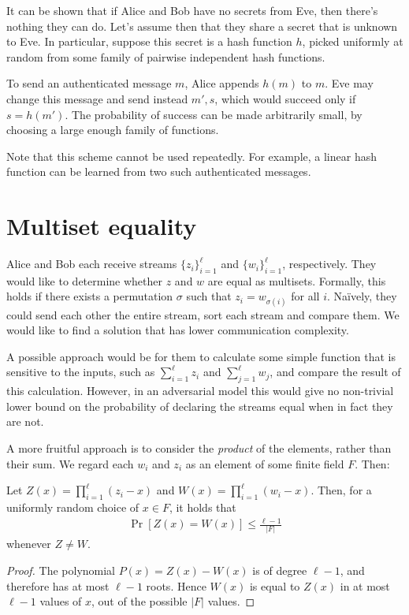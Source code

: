 \documentclass{article}
\begin{document}
It can be shown that if Alice and Bob have no secrets from Eve, then
there's nothing they can do. Let's assume then that they share a
secret that is unknown to Eve. In particular, suppose this secret is a
hash function $h$, picked uniformly at random from some family of
pairwise independent hash functions.

To send an authenticated message $m$, Alice appends $h(m)$ to $m$. Eve
may change this message and send instead $m',s$, which would succeed
only if $s=h(m')$. The probability of success can be made arbitrarily
small, by choosing a large enough family of functions.

Note that this scheme cannot be used repeatedly. For example, a linear
hash function can be learned from two such authenticated messages.

\section{Multiset equality}
Alice and Bob each receive streams $\{z_i\}_{i=1}^\ell$ and
$\{w_i\}_{i=1}^\ell$, respectively. They would like to determine whether
$z$ and $w$ are equal as multisets. Formally, this holds if there
exists a permutation $\sigma$ such that $z_i=w_{\sigma(i)}$ for all
$i$. Na\"ively, they could send each other the entire stream, sort
each stream and compare them. We would like to find a solution that
has lower communication complexity.

A possible approach would be for them to calculate some simple
function that is sensitive to the inputs, such as $\sum_{i=1}^\ell z_i$
and $\sum_{j=1}^\ell w_j$, and compare the result of this
calculation. However, in an adversarial model this would give no
non-trivial lower bound on the probability of declaring the streams
equal when in fact they are not.

A more fruitful approach is to consider the {\em product} of the
elements, rather than their sum. We regard each $w_i$ and $z_i$ as an
element of some finite field $F$. Then:
\begin{claim}
  Let $Z(x)=\prod_{i=1}^\ell(z_i-x)$ and
  $W(x)=\prod_{i=1}^\ell(w_i-x)$. Then, for a uniformly random choice
  of $x \in F$, it holds that
  \begin{align*}
    \Pr[Z(x)=W(x)] \leq \frac{\ell-1}{|F|}
  \end{align*}
  whenever $Z \neq W$.
\end{claim}
\begin{proof}
  The polynomial $P(x)=Z(x)-W(x)$ is of degree $\ell-1$, and therefore
  has at most $\ell-1$ roots. Hence $W(x)$ is equal to $Z(x)$ in at most
  $\ell-1$ values of $x$, out of the possible $|F|$ values.
\end{proof}
\end{document}
